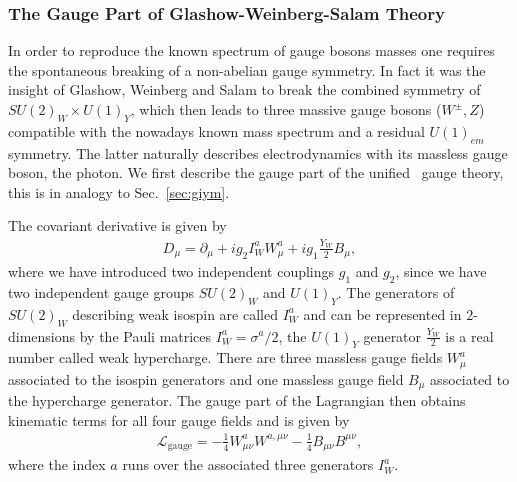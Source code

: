 \subsubsection{The Gauge Part of Glashow-Weinberg-Salam Theory}
\label{sec:gwsgauge}
In order to reproduce the known spectrum of gauge bosons masses one requires the spontaneous breaking of a non-abelian gauge symmetry. In fact it was the insight of Glashow, Weinberg
and Salam \cite{Glashow1961a,Weinberg1967a,Salam1968,Glashow1970} to
break the combined symmetry of $SU(2)_W\times U(1)_Y$, which then leads to
three massive gauge bosons ($W^\pm,Z$) compatible with the nowadays known mass spectrum and a
residual $U(1)_{em}$ symmetry. The latter naturally describes
electrodynamics with its massless gauge boson, the photon. We first describe the gauge part
of the unified \ew~gauge theory, this is in analogy to
Sec.~\ref{sec:giym}.


The covariant derivative is given by
\begin{align}\label{eq:codesu2}
    D_\mu = \partial_\mu + i g_2 I^a_W W^a_\mu + i g_1 \frac{Y_W}{2}B_\mu,
\end{align}
where we have introduced two independent couplings $g_1$ and
$g_2$, since we have two independent gauge groups $SU(2)_W$ and $U(1)_Y$. The generators of $SU(2)_W$
describing weak isospin are called $I_W^a$ and can be represented in
$2$-dimensions by the Pauli matrices $I_W^a=\sigma^a/2$, the $U(1)_Y$ generator $\frac{Y_W}{2}$
is a real number called weak hypercharge. There are three massless
gauge fields $W^a_\mu$ associated to the isospin generators and one
massless gauge field $B_\mu$ associated to the hypercharge
generator. The gauge part of the Lagrangian then obtains kinematic
terms for all four gauge fields and is given by
\begin{align}\label{eq:ewgaugelag}
  \mathcal{L}_{\text{gauge}}=-\frac{1}{4}W^a_{\mu\nu}W^{a,\mu\nu}-\frac{1}{4}B_{\mu\nu}B^{\mu\nu},
\end{align} 
where the index $a$ runs over the associated three generators $I_W^a$.
